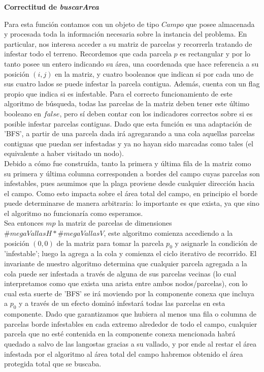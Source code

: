 \textbf{Correctitud de \textit{buscarArea} }

\indent Para esta función contamos con un objeto de tipo $Campo$ que posee almacenada y procesada toda la información necesaria sobre la instancia del problema. En particular, nos interesa acceder a su matriz de parcelas y recorrerla tratando de infestar todo el terreno. Recordemos que cada parcela $p$ es rectangular y por lo tanto posee un entero indicando su área, una coordenada que hace referencia a su posición $(i,j)$ en la matriz, y cuatro booleanos que indican si por cada uno de sus cuatro lados se puede infestar la parcela contigua. Además, cuenta con un flag propio que indica si es infestable. Para el correcto funcionamiento de este algoritmo de búsqueda, todas las parcelas de la matriz deben tener este último booleano en $false$, pero sí deben contar con los indicadores correctos sobre si es posible infestar parcelas contiguas. Dado que esta función es una adaptación de 'BFS', a partir de una parcela dada irá agregarando a una cola aquellas parcelas contiguas que puedan ser infestadas y ya no hayan sido marcadas como tales (el equivalente a haber visitado un nodo).\\
\indent Debido a cómo fue construída, tanto la primera y última fila de la matriz como su primera y última columna corresponden a bordes del campo cuyas parcelas son infestables, pues asumimos que la plaga proviene desde cualquier dirección hacia el campo. Como esto impacta sobre el área total del campo, en principio el borde puede determinarse de manera arbitraria: lo importante es que exista, ya que sino el algoritmo no funcionaría como esperamos.\\
\indent Sea entonces $mp$ la matriz de parcelas de dimensiones $\#megaVallasH*\#megaVallasV$, este algoritmo comienza accediendo a la posición $(0,0)$ de la matriz para tomar la parcela $p_{0}$ y asignarle la condición de 'infestable'; luego la agrega a la cola y comienza el ciclo iterativo de recorrido. El invariante de nuestro algoritmo determina que cualquier parcela agregada a la cola puede ser infestada a través de alguna de sus parcelas vecinas (lo cual interpretamos como que exista una arista entre ambos nodos/parcelas), con lo cual esta suerte de 'BFS' se irá moviendo por la componente conexa que incluya a $p_{0}$ y a través de un efecto dominó infestará todas las parcelas en esta componente. Dado que garantizamos que hubiera al menos una fila o columna de parcelas borde infestables en cada extremo alrededor de todo el campo, cualquier parcela que no esté contenida en la componente conexa mencionada habrá quedado a salvo de las langostas gracias a su vallado, y por ende al restar el área infestada por el algoritmo al área total del campo habremos obtenido el área protegida total que se buscaba.\\
